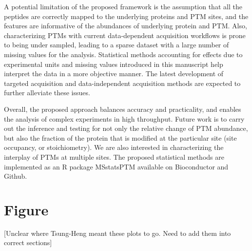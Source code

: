 \documentclass[mcp]{article}
\numberwithin{figure}{section} %
\numberwithin{table}{section}
\def\todo#1{{\color{red}[#1]}}
\begin{document}
A potential limitation of the proposed framework is the assumption that all the peptides are correctly mapped to the underlying proteins and PTM sites, and the features are informative of the abundances of underlying protein and PTM. Also, characterizing PTMs with current data-dependent acquisition workflows is prone to being under sampled, leading to a sparse dataset with a large number of missing values for the analysis. Statistical methods accounting for effects due to experimental units and missing values introduced in this manuscript help interpret the data in a more objective manner. The latest development of targeted acquisition and data-independent acquisition methods are expected to further alleviate these issues. 

Overall, the proposed approach balances accuracy and practicality, and enables the analysis of complex experiments in high throughput. Future work is to carry out the inference and testing for not only the relative change of PTM abundance, but also the fraction of the protein that is modified at the particular site (site occupancy, or stoichiometry). We are also interested in characterizing the interplay of PTMs at multiple sites. The proposed statistical methods are implemented as an R package MSstatsPTM available on Bioconductor and Github.



\section{Figure}
\todo{Unclear where Tsung-Heng meant these plots to go. Need to add them into correct sections}
\end{document}

